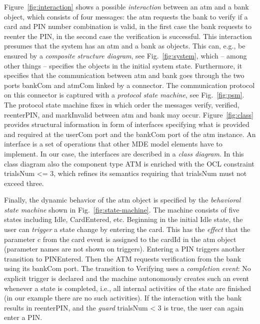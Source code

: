 \documentclass[10pt,fleqn,final]{scrreprt}
\newenvironment{definitions}[0]{\medskip }{}
\newcommand{\uml}[1]{\textsf{#1}}
\begin{document}
\begin{definitions}
Figure~\ref{fig:interaction} shows a possible \emph{interaction} between
an \uml{atm} and a \uml{bank} object, which consists of four messages:
the \uml{atm} requests the \uml{bank} to \uml{verify} if a card and PIN
number combination is valid, in the first case the \uml{bank} requests
to reenter the PIN, in the second case the verification is successful.
This interaction presumes that the system has an \uml{atm} and a
\uml{bank} as objects. This can, e.g., be ensured by a \emph{composite
  structure diagram}, see Fig.~\ref{fig:system}, which -- among other
things -- specifies the objects in the initial system state.
Furthermore, it specifies that the communication between \uml{atm} and
\uml{bank} goes through the two ports \uml{bankCom} and \uml{atmCom}
linked by a connector.  The communication protocol on this connector is
captured with a \emph{protocol state machine}, see Fig.~\ref{fig:psm}.
The protocol state machine fixes in which order the messages
\uml{verify}, \uml{verified}, \uml{reenterPIN}, and \uml{markInvalid}
between \uml{atm} and \uml{bank} may occur.  Figure~\ref{fig:class}
provides structural information in form of interfaces specifying what is
provided and required at the \uml{userCom} port and the \uml{bankCom}
port of the \uml{atm} instance.  An interface is a set of operations
that other MDE model elements have to implement. In our case, the
interfaces are described in a \emph{class diagram}. In this class
diagram also the component type \uml{ATM} is enriched with the OCL
constraint \uml{trialsNum <= 3}, which refines its semantics requiring
that \uml{trialsNum} must not exceed three.

Finally, the dynamic behavior of the \uml{atm} object is specified by
the \emph{behavioral state machine} shown in
Fig.~\ref{fig:state-machine}. The machine consists of five states
including \uml{Idle}, \uml{CardEntered}, etc.  Beginning in the
initial \uml{Idle} state, the user can \emph{trigger} a state change
by entering the \uml{card}. This has the \emph{effect} that the
parameter \uml{c} from the \uml{card} event is assigned to the
\uml{cardId} in the \uml{atm} object (parameter names are not shown on
triggers). Entering a \uml{PIN} triggers another transition to
\uml{PINEntered}.  Then the ATM requests verification from the bank
using its \uml{bankCom} port.  The transition to \uml{Verifying} uses
a \emph{completion event}: No explicit trigger is declared and the
machine autonomously creates such an event whenever a state is
completed, i.e., all internal activities of the state are finished (in
our example there are no such activities).  If the interaction with
the bank results in \uml{reenterPIN}, and the \emph{guard}
\uml{trialsNum < 3} is true, the user can again enter a \uml{PIN}.



\end{definitions}
\end{document}
